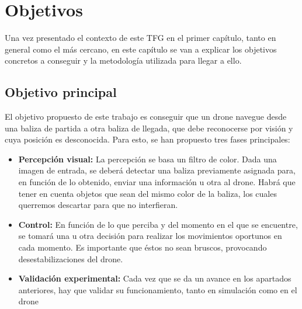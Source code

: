 \chapter{Objetivos}\label{cap.Objetivos}
\hspace{1 cm} Una vez presentado el contexto de este TFG en el primer cap\'itulo, tanto en general como el m\'as cercano, en este cap\'itulo se van a explicar los objetivos concretos a conseguir y la metodolog\'ia utilizada para llegar a ello.

\section{Objetivo principal}
\hspace{1 cm} El objetivo propuesto de este trabajo es conseguir que un drone navegue desde una baliza de partida a otra baliza de llegada, que debe reconocerse por visi\'on y cuya posici\'on es desconocida. Para esto, se han propuesto tres fases principales:

\begin{itemize}
\item \textbf{Percepci\'on visual:} La percepci\'on se basa un filtro de color. Dada una imagen de entrada, se deber\'a detectar una baliza previamente asignada para, en funci\'on de lo obtenido, enviar una informaci\'on u otra al drone. Habr\'a que tener en cuenta objetos que sean del mismo color de la baliza, los cuales querremos descartar para que no interfieran. 

\item \textbf{Control:} En funci\'on de lo que perciba y del momento en el que se encuentre, se tomar\'a una u otra decisi\'on para realizar los movimientos oportunos en cada momento. Es importante que \'estos no sean bruscos, provocando desestabilizaciones del drone.

\item \textbf{Validaci\'on experimental:} Cada vez que se da un avance en los apartados anteriores, hay que validar su funcionamiento, tanto en simulaci\'on como en el drone

\end{itemize}

